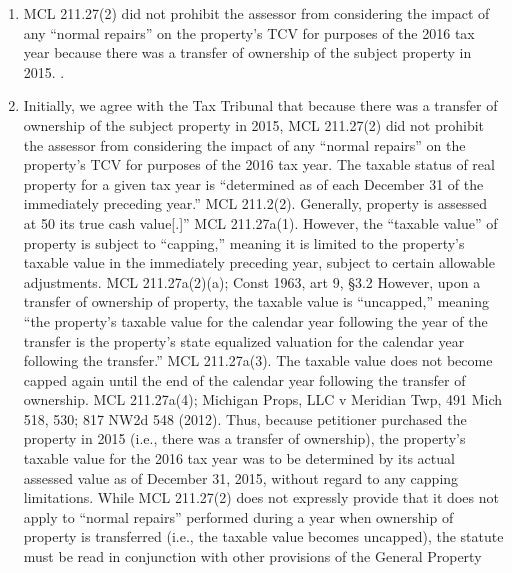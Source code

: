 \documentclass[12pt,\documentclassflag]{michiganCourtOfAppealsBrief}
\begin{document}
\begin{enumerate}
  \item MCL 211.27(2) did not prohibit the assessor from considering the impact
of any ``normal repairs'' on the property's TCV for purposes of the 2016 tax year because there was a transfer of ownership of the
subject property in 2015. .

\item Initially, we agree with the Tax Tribunal that because there was a transfer of ownership of the
subject property in 2015, MCL 211.27(2) did not prohibit the assessor from considering the impact
of any ``normal repairs'' on the property's TCV for purposes of the 2016 tax year.
The taxable status of real property for a given tax year is ``determined as of each December
31 of the immediately preceding year.'' MCL 211.2(2). Generally, property is assessed at 50%
its true cash value[.]'' MCL 211.27a(1). However, the ``taxable value'' of property is subject to
``capping,'' meaning it is limited to the property's taxable value in the immediately preceding year,
subject to certain allowable adjustments. MCL 211.27a(2)(a); Const 1963, art 9, \S 3.2
 However,
upon a transfer of ownership of property, the taxable value is ``uncapped,'' meaning ``the property's
taxable value for the calendar year following the year of the transfer is the property's state
equalized valuation for the calendar year following the transfer.'' MCL 211.27a(3). The taxable
value does not become capped again until the end of the calendar year following the transfer of
ownership. MCL 211.27a(4); Michigan Props, LLC v Meridian Twp, 491 Mich 518, 530; 817
NW2d 548 (2012). Thus, because petitioner purchased the property in 2015 (i.e., there was a
transfer of ownership), the property's taxable value for the 2016 tax year was to be determined by
its actual assessed value as of December 31, 2015, without regard to any capping limitations.
While MCL 211.27(2) does not expressly provide that it does not apply to ``normal repairs''
performed during a year when ownership of property is transferred (i.e., the taxable value becomes
uncapped), the statute must be read in conjunction with other provisions of the General Property


\end{enumerate}
\end{document}

